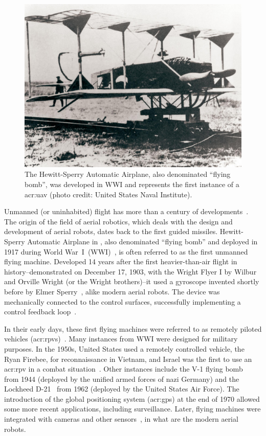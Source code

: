 \begin{figure}[t]
  \centering
  \includegraphics[width=.7\textwidth]{pictures/HA-NH-JA-19_1}
  \caption[Hewitt-Sperry Automatic Airplane, first unmanned flying machine]{The Hewitt-Sperry Automatic Airplane, also denominated ``flying bomb'', was developed in WWI and represents the first instance of a \Gls{acr:uav} {\scriptsize(photo credit: United States Naval Institute)}.}   
  \label{fig:hewitt-sperry}
\end{figure}
Unmanned (or uninhabited) flight has more than a century of developments~\citep{siciliano2016springer}. The origin of the field of aerial robotics, which deals with the design and development of aerial robots, dates back to the first guided missiles. Hewitt-Sperry Automatic Airplane in , also denominated ``flying bomb'' and deployed in 1917 during World War~I~(WWI)~\citep{keane2013brief,valavanis2015handbook}, is often referred to as the first unmanned flying machine. Developed 14 years after the first heavier-than-air flight in history--demonstrated on December 17, 1903, with the Wright Flyer I by Wilbur and Orville Wright (or the Wright brothers)--it used a gyroscope invented shortly before by Elmer Sperry~\citep{keane2013brief}, alike modern aerial robots. The device was mechanically connected to the control surfaces, successfully implementing a control feedback loop~\citep{siciliano2016springer}.

In their early days, these first flying machines were referred to as remotely piloted vehicles (\Gls{acr:rpv}s)~\citep{anderson2005introduction}. Many instances from WWI were designed for military purposes. In the 1950s, United States used a remotely controlled vehicle, the Ryan Firebee, for reconnaissance in Vietnam, and Israel was the first to use an \Gls{acr:rpv} in a combat situation~\citep{anderson2005introduction}. Other instances include the V-1 flying bomb~ from 1944 (deployed by the unified armed forces of nazi Germany) and the Lockheed D-21~ from 1962 (deployed by the United States Air Force). The introduction of the global positioning system (\Gls{acr:gps}) at the end of 1970 allowed some more recent applications, including surveillance. Later, flying machines were integrated with cameras and other sensors~\citep{siciliano2016springer}, in what are the modern aerial robots.

